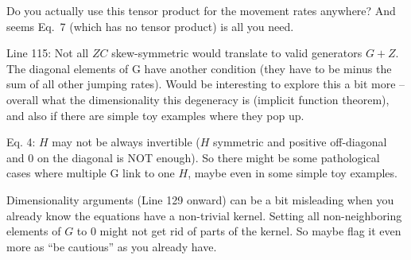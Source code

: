 
\begin{point}{\revref}
    Do you actually use this tensor product for the movement
    rates anywhere? And seems Eq.\ 7 (which has no tensor product) is all you
    need.
\end{point}


\begin{point}{Line 115:}
    Not all $ZC$ skew-symmetric would translate to valid generators 
    $G + Z$. The diagonal elements of G have another condition (they have to be minus
    the sum of all other jumping rates). Would be interesting to explore this a
    bit more -- overall what the dimensionality this degeneracy is (implicit
    function theorem), and also if there are simple toy examples where they pop
    up.
\end{point}


\begin{point}{Eq. 4:}
    $H$ may not be always invertible ($H$ symmetric and positive off-diagonal
    and 0 on the diagonal is NOT enough). So there might be some pathological
    cases where multiple G link to one $H$, maybe even in some simple toy
    examples.
\end{point}


\begin{point}{}
    Dimensionality arguments (Line 129 onward) can be a bit misleading when you
    already know the equations have a non-trivial kernel. Setting all
    non-neighboring elements of $G$ to 0 might not get rid of parts of the
    kernel. So maybe flag it even more as ``be cautious'' as you already have.
\end{point}

